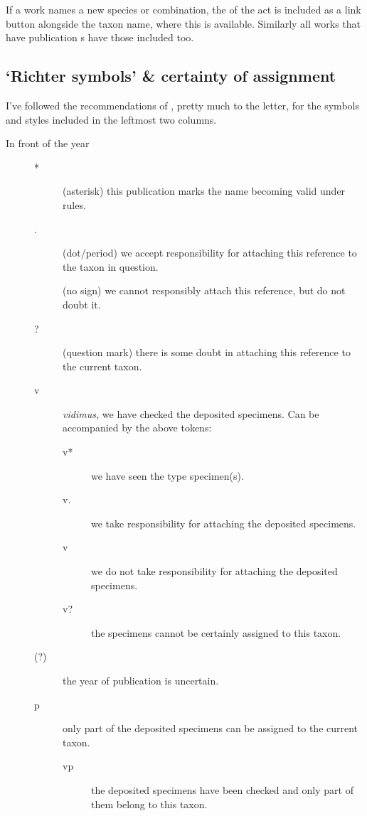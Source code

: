 If a work names a new species or combination, the  of the act is
included as a link button alongside the taxon
name,
where this is available. Similarly all works that have publication
s have those included too.


\subsection{‘Richter symbols’ \& certainty of assignment}%
\label{sub:richter-symbols}

I've followed the recommendations of \textcite{Matthews1973P}, pretty much to the
letter, for the symbols and styles included in the leftmost two columns.

\begin{description}
    \item[In front of the year] \par
    \begin{description}
        \item[*] (asterisk) this publication marks the name becoming valid under
             rules.
        \item[.] (dot/period) we accept responsibility for attaching this reference
            to the taxon in question.
        \item[] (no sign) we cannot responsibly attach this reference, but do not
            doubt it.
        \item[?] (question mark) there is some doubt in attaching this reference to
            the current taxon.
        \item[v] \emph{vidimus,} we have checked the deposited specimens. Can be
            accompanied by the above tokens:
            \begin{description}
                \item[v*] we have seen the type specimen(s).
                \item[v.] we take responsibility for attaching the deposited specimens.
                \item[v] we do not take responsibility for attaching the deposited
                    specimens.
                \item[v?] the specimens cannot be certainly assigned to this taxon.
            \end{description}
        \item[(?)] the year of publication is uncertain.
        \item[p] only part of the deposited specimens can be assigned to the current
            taxon.
            \begin{description}
                \item[vp] the deposited specimens have been checked and only part of
                    them belong to this taxon.
            \end{description}
    \end{description}


\end{description}
